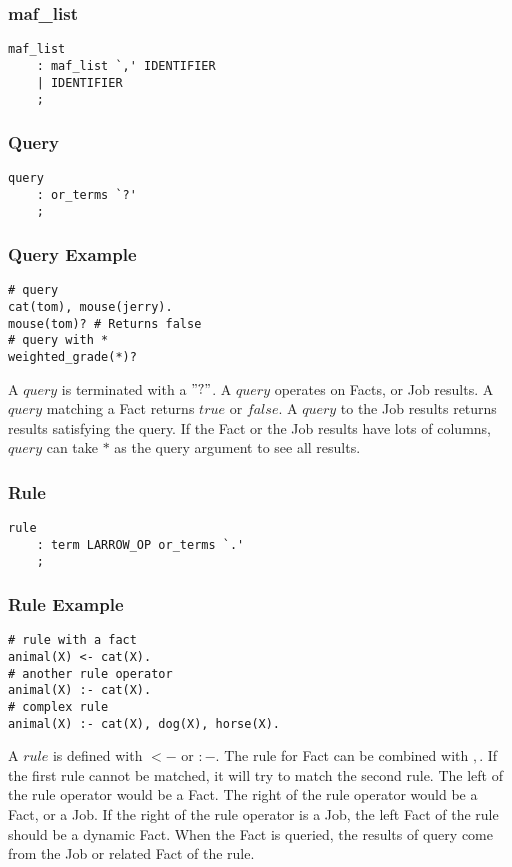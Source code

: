 \documentclass[prodmode,acmtecs]{acmsmall}
\begin{document}
\subsubsection{maf_list}
\begin{lstlisting}
maf_list
	: maf_list `,' IDENTIFIER
	| IDENTIFIER		
	;
\end{lstlisting}

\subsubsection{Query}
\begin{lstlisting}
query
	: or_terms `?'		
	;
\end{lstlisting}

\subsubsection{Query Example}
\begin{lstlisting}
# query
cat(tom), mouse(jerry).
mouse(tom)? # Returns false
# query with *
weighted_grade(*)?
\end{lstlisting}

A $query$ is terminated with a $"?"$. A $query$ operates on Facts, or Job results. A $query$ 
 matching a Fact returns $true$ or $false$. A $query$ to the Job results returns results 
 satisfying the query. If the Fact or the Job results have lots of columns, $query$ can
 take $*$ as the query argument to see all results.
\medskip

\subsubsection{Rule}
\begin{lstlisting}
rule
	: term LARROW_OP or_terms `.'
	;
\end{lstlisting}

\subsubsection{Rule Example}
\begin{lstlisting}
# rule with a fact
animal(X) <- cat(X).
# another rule operator
animal(X) :- cat(X).
# complex rule
animal(X) :- cat(X), dog(X), horse(X).
\end{lstlisting}

A $rule$ is defined with $<-$ or $:-$. The rule for Fact can be combined with $,$.
 If the first rule cannot be matched, it will try to match the second rule.
 The left of the rule operator would be a Fact. The right of the rule operator would
 be a Fact, or a Job. If the right of the rule operator is a Job,
 the left Fact of the rule should be a dynamic Fact. When the Fact is queried,
 the results of query come from the Job or related Fact of the rule.
\medskip
\end{document}
